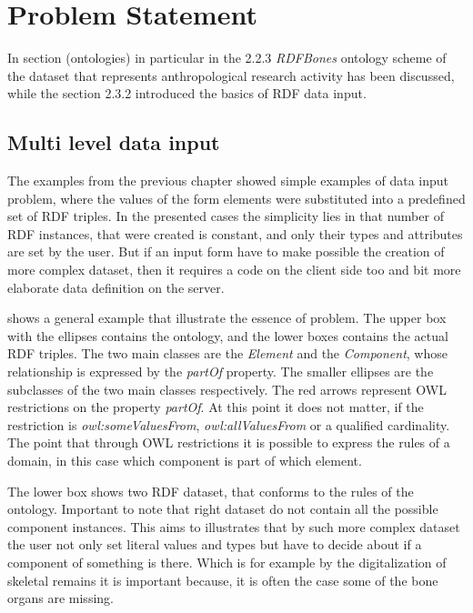 \chapter{Problem Statement}


In section (ontologies) in particular in the 2.2.3 \textit{RDFBones} ontology scheme of the dataset that represents anthropological research activity has been discussed, while the section 2.3.2 introduced the basics of RDF data input. 


\section{Multi level data input}


The examples from the previous chapter showed simple examples of data input problem, where the values of the form elements were substituted into a predefined set of RDF triples. In the presented cases the simplicity lies in that number of RDF instances, that were created is constant, and only their types and attributes are set by the user. But if an input form have to make possible the creation of more complex dataset, then it requires a code on the client side too and bit more elaborate data definition on the server.

 shows a general example that illustrate the essence of problem. The upper box with the ellipses contains the ontology, and the lower boxes contains the actual RDF triples.
The two main classes are the \textit{Element} and the \textit{Component}, whose relationship is expressed by the \textit{partOf} property. The smaller ellipses are the subclasses of the two main classes respectively. The red arrows represent OWL restrictions on the property \textit{partOf}. At this point it does not matter, if the restriction is \textit{owl:someValuesFrom}, \textit{owl:allValuesFrom} or a qualified cardinality. The point that through OWL restrictions it is possible to express the rules of a domain, in this case which component is part of which element. 



The lower box shows two RDF dataset, that conforms to the rules of the ontology. Important to note that right dataset do not contain all the possible component instances. This aims to illustrates that by such more complex dataset the user not only set literal values and types but have to decide about if a component of something is there. Which is for example by the digitalization of skeletal remains it is important because, it is often the case some of the bone organs are missing. 

